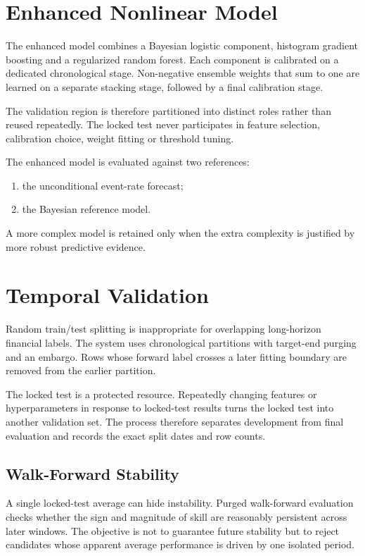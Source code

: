 \documentclass[11pt]{article}
\begin{document}
\section{Enhanced Nonlinear Model}
The enhanced model combines a Bayesian logistic component, histogram gradient boosting and a regularized random forest. Each component is calibrated on a dedicated chronological stage. Non-negative ensemble weights that sum to one are learned on a separate stacking stage, followed by a final calibration stage.

The validation region is therefore partitioned into distinct roles rather than reused repeatedly. The locked test never participates in feature selection, calibration choice, weight fitting or threshold tuning.

The enhanced model is evaluated against two references:
\begin{enumerate}[itemsep=0.2em]
\item the unconditional event-rate forecast;
\item the Bayesian reference model.
\end{enumerate}
A more complex model is retained only when the extra complexity is justified by more robust predictive evidence.

\section{Temporal Validation}
Random train/test splitting is inappropriate for overlapping long-horizon financial labels. The system uses chronological partitions with target-end purging and an embargo. Rows whose forward label crosses a later fitting boundary are removed from the earlier partition.

The locked test is a protected resource. Repeatedly changing features or hyperparameters in response to locked-test results turns the locked test into another validation set. The process therefore separates development from final evaluation and records the exact split dates and row counts.

\subsection{Walk-Forward Stability}
A single locked-test average can hide instability. Purged walk-forward evaluation checks whether the sign and magnitude of skill are reasonably persistent across later windows. The objective is not to guarantee future stability but to reject candidates whose apparent average performance is driven by one isolated period.
\end{document}
